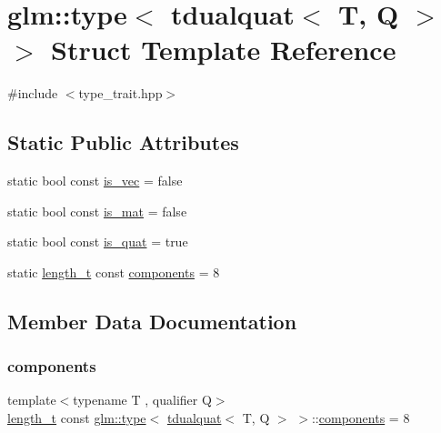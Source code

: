 \hypertarget{structglm_1_1type_3_01tdualquat_3_01_t_00_01_q_01_4_01_4}{}\section{glm\+:\+:type$<$ tdualquat$<$ T, Q $>$ $>$ Struct Template Reference}
\label{structglm_1_1type_3_01tdualquat_3_01_t_00_01_q_01_4_01_4}


{\ttfamily \#include $<$type\+\_\+trait.\+hpp$>$}

\subsection*{Static Public Attributes}
\begin{DoxyCompactItemize}
\item 
static bool const \hyperlink{structglm_1_1type_3_01tdualquat_3_01_t_00_01_q_01_4_01_4_ab10de3a5cc6cb536a7464fbe07aadeb4}{is\+\_\+vec} = false
\item 
static bool const \hyperlink{structglm_1_1type_3_01tdualquat_3_01_t_00_01_q_01_4_01_4_a733a4f2d4dda8bcbf732ec5a8123ecc5}{is\+\_\+mat} = false
\item 
static bool const \hyperlink{structglm_1_1type_3_01tdualquat_3_01_t_00_01_q_01_4_01_4_a2205290f32121fe4f7f058c53671359e}{is\+\_\+quat} = true
\item 
static \hyperlink{namespaceglm_a090a0de2260835bee80e71a702492ed9}{length\+\_\+t} const \hyperlink{structglm_1_1type_3_01tdualquat_3_01_t_00_01_q_01_4_01_4_a781f382733b9a6e596b675488b2e3e74}{components} = 8
\end{DoxyCompactItemize}


\subsection{Member Data Documentation}
\mbox{\label{structglm_1_1type_3_01tdualquat_3_01_t_00_01_q_01_4_01_4_a781f382733b9a6e596b675488b2e3e74}} 
\subsubsection{\texorpdfstring{components}{components}}
{\footnotesize\ttfamily template$<$typename T , qualifier Q$>$ \\
\hyperlink{namespaceglm_a090a0de2260835bee80e71a702492ed9}{length\+\_\+t} const \hyperlink{structglm_1_1type}{glm\+::type}$<$ \hyperlink{structglm_1_1tdualquat}{tdualquat}$<$ T, Q $>$ $>$\+::\hyperlink{_s_d_l__opengl__glext_8h_a3824c86dfa50d23068c74eafb87375c2}{components} = 8\hspace{0.3cm}{\ttfamily [static]}}

